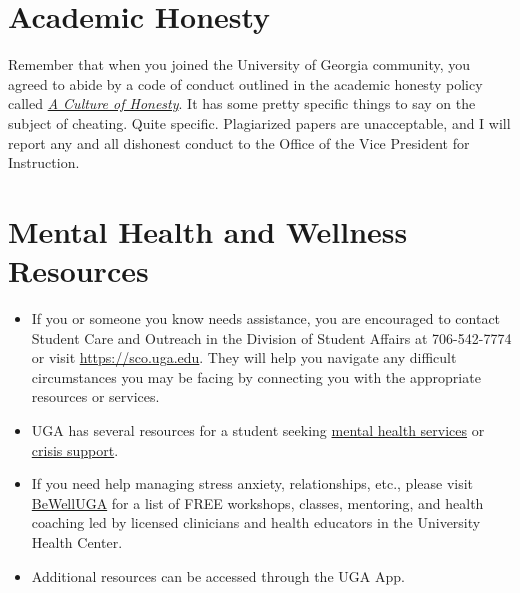 \documentclass[11pt, letterpaper]{article}
\begin{document}




\section*{Academic Honesty}

Remember that when you joined the University of Georgia community, you agreed to abide by a code of conduct outlined in the academic honesty policy called \href{https://honesty.uga.edu/Academic-Honesty-Policy/Introduction/}{\textit{A Culture of Honesty}}. It has some pretty specific things to say on the subject of cheating. Quite specific. Plagiarized papers are unacceptable, and I will report any and all dishonest conduct to the Office of the Vice President for Instruction.

\section*{Mental Health and Wellness Resources}

\begin{itemize}
\item If you or someone you know needs assistance, you are encouraged to contact Student Care and Outreach in the Division of Student Affairs at 706-542-7774 or visit \href{https://sco.uga.edu}{https://sco.uga.edu}. They will help you navigate any difficult circumstances you may be facing by connecting you with the appropriate resources or services. 
\item UGA has several resources for a student seeking \href{https://www.uhs.uga.edu/bewelluga/bewelluga}{mental health services} or \href{https://www.uhs.uga.edu/info/emergencies}{crisis support}. 
\item If you need help managing stress anxiety, relationships, etc., please visit \href{https://www.uhs.uga.edu/bewelluga/bewelluga}{BeWellUGA} for a list of FREE workshops, classes, mentoring, and health coaching led by licensed clinicians and health educators in the University Health Center.
\item Additional resources can be accessed through the UGA App.
\end{itemize}



\end{document}
